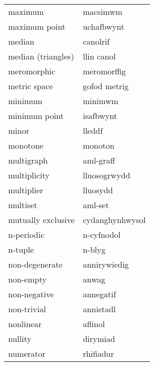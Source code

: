 \begin{supertabular}{p{0.22\textwidth}p{0.22\textwidth}}
                          maximum &                         macsimwm \\
                    maximum point &                       uchafbwynt \\
                           median &                         canolrif \\
               median (triangles) &                       llin canol \\
                      meromorphic &                      meromorffig \\
                     metric space &                     gofod metrig \\
                          minimum &                          minimwm \\
                    minimum point &                        isafbwynt \\
                            minor &                           lleddf \\
                         monotone &                          monoton \\
                       multigraph &                        aml-graff \\
                     multiplicity &                     lluosogrwydd \\
                       multiplier &                         lluosydd \\
                         multiset &                          aml-set \\
               mutually exclusive &                  cydanghynhwysol \\
                       n-periodic &                       n-cyfnodol \\
                          n-tuple &                           n-blyg \\
                   non-degenerate &                     annirywiedig \\
                        non-empty &                            anwag \\
                     non-negative &                        annegatif \\
                      non-trivial &                        annistadl \\
                        nonlinear &                          aflinol \\
                          nullity &                         dirymiad \\
                        numerator &                        rhifiadur \\

\end{supertabular}
